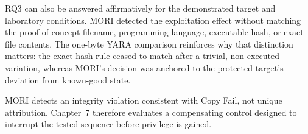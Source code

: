 RQ3 can also be answered affirmatively for the demonstrated target and
laboratory conditions. MORI detected the exploitation effect without matching
the proof-of-concept filename, programming language, executable hash, or exact
file contents. The one-byte YARA comparison reinforces why that distinction
matters: the exact-hash rule ceased to match after a trivial, non-executed
variation, whereas MORI's decision was anchored to the protected target's
deviation from known-good state.

MORI detects an integrity violation consistent with Copy Fail, not unique
attribution. Chapter~7 therefore evaluates a compensating control designed to
interrupt the tested sequence before privilege is gained.